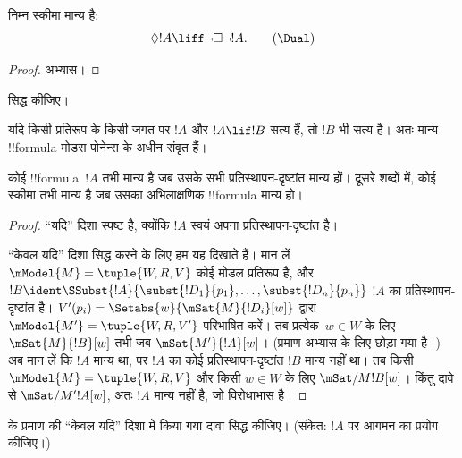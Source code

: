 \documentclass[../../../include/open-logic-section]{subfiles}
\begin{document}
\begin{prop}
  निम्न स्कीमा \Dual{} मान्य है:
  \begin{equation*}
  \Diamond !A \liff \lnot\Box\lnot !A. \tag{\Dual}
  \end{equation*}
\end{prop}

\begin{proof}
  अभ्यास।
\end{proof}

\begin{prob}
   सिद्ध कीजिए।
\end{prob}

\begin{prop}
  यदि किसी प्रतिरूप के किसी जगत पर $!A$ और $!A \lif !B$ सत्य हैं, तो $!B$
  भी सत्य है। अतः मान्य !!{formula} मोडस पोनेन्स के अधीन संवृत हैं।
\end{prop}

\begin{prop}
  कोई !!{formula}~$!A$ तभी मान्य है जब उसके सभी प्रतिस्थापन-दृष्टांत मान्य
  हों। दूसरे शब्दों में, कोई स्कीमा तभी मान्य है जब उसका अभिलाक्षणिक
  !!{formula} मान्य हो।
\end{prop}

\begin{proof}
  ``यदि'' दिशा स्पष्ट है, क्योंकि $!A$ स्वयं अपना प्रतिस्थापन-दृष्टांत है।

  ``केवल यदि'' दिशा सिद्ध करने के लिए हम यह दिखाते हैं। मान लें
  $\mModel{M} = \tuple{W, R, V}$ कोई मोडल प्रतिरूप है, और $!B \ident
  \SSubst{!A}{\subst{!D_1}{p_1},\dots,\subst{!D_n}{p_n}}$
  $!A$ का प्रतिस्थापन-दृष्टांत है। $V'(p_i) =
  \Setabs{w}{\mSat{M}{!D_i}[w]}$ द्वारा
  $\mModel{M'} = \tuple{W, R, V'}$ परिभाषित करें। तब प्रत्येक~$w \in W$
  के लिए $\mSat{M}{!B}[w]$ तभी जब $\mSat{M'}{!A}[w]$। (प्रमाण अभ्यास के
  लिए छोड़ा गया है।) अब मान लें कि $!A$ मान्य था, पर $!A$ का कोई
  प्रतिस्थापन-दृष्टांत $!B$ मान्य नहीं था। तब किसी
  $\mModel{M} = \tuple{W, R, V}$ और किसी $w \in W$ के लिए
  $\mSat/{M}{!B}[w]$। किंतु दावे से $\mSat/{M'}{!A}[w]$, अतः $!A$ मान्य
  नहीं है, जो विरोधाभास है।
\end{proof}

\begin{prob}
   के प्रमाण की ``केवल यदि'' दिशा
  में किया गया दावा सिद्ध कीजिए। (संकेत: $!A$ पर आगमन का प्रयोग कीजिए।)
\end{prob}
\end{document}
